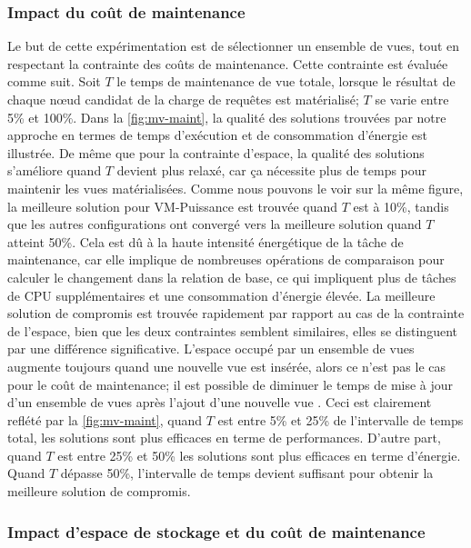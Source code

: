 \subsubsection{Impact du coût de maintenance}\label{subsubsec:ImpactMaintenance}
Le but de cette expérimentation est de sélectionner un ensemble de vues, tout en respectant la contrainte des coûts de maintenance. Cette contrainte est évaluée comme suit. Soit $T$ le temps de maintenance de vue totale, lorsque le résultat de chaque nœud candidat de la charge de requêtes est matérialisé; $T$ se varie entre 5\% et 100\%. Dans la \ref{fig:mv-maint}, la qualité des solutions trouvées par notre approche en termes de temps d'exécution et de consommation d'énergie est illustrée. De même que pour la contrainte d'espace, la qualité des solutions s'améliore quand $T$ devient plus relaxé, car ça nécessite plus de temps pour maintenir les vues matérialisées.
Comme nous pouvons le voir sur la même figure, la meilleure solution pour VM-Puissance est trouvée quand $T$ est à 10\%, tandis que les autres configurations ont convergé vers la meilleure solution quand $T$ atteint 50\%. Cela est dû à la haute intensité énergétique de la tâche de maintenance, car elle implique de nombreuses opérations de comparaison pour calculer le changement dans la relation de base, ce qui impliquent plus de tâches de CPU supplémentaires et une consommation d'énergie élevée. La meilleure solution de compromis est trouvée rapidement par rapport au cas de la contrainte de l'espace, bien que les deux contraintes semblent similaires, elles se distinguent par une différence significative. L'espace occupé par un ensemble de vues augmente toujours quand une nouvelle vue est insérée, alors ce n'est pas le cas pour le coût de maintenance; il est possible de diminuer le temps de mise à jour d'un ensemble de vues après l'ajout d'une nouvelle vue \cite{Mami12}. Ceci est clairement reflété par la \ref{fig:mv-maint}, quand $T$ est entre 5\% et 25\% de l'intervalle de temps total, les solutions sont plus efficaces en terme de performances. D'autre part, quand $T$ est entre 25\% et 50\% les solutions sont plus efficaces en terme d'énergie. Quand $T$ dépasse 50\%, l'intervalle de temps devient suffisant pour obtenir la meilleure solution de compromis.

\subsubsection{Impact d'espace de stockage et du coût de maintenance}\label{subsubsec:ImpactMaintenanceStorage}

